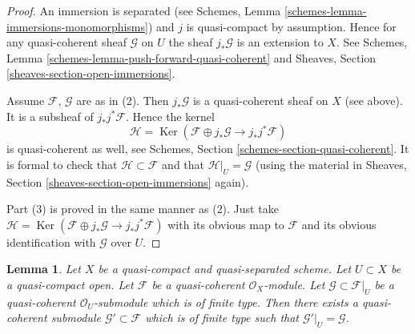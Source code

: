 \documentclass{stacks-project}
\theoremstyle{plain}
\newtheorem{lemma}[subsection]{Lemma}
\theoremstyle{definition}
\theoremstyle{remark}
\numberwithin{equation}{subsection}
\def\Ker{\mathop{\mathrm{Ker}}}
\begin{document}
\begin{proof}
An immersion is separated
(see Schemes, Lemma \ref{schemes-lemma-immersions-monomorphisms})
and $j$ is quasi-compact by assumption.
Hence for any quasi-coherent sheaf $\mathcal{G}$ on $U$ the sheaf
$j_*\mathcal{G}$ is an extension to $X$. See
Schemes, Lemma \ref{schemes-lemma-push-forward-quasi-coherent} and
Sheaves, Section \ref{sheaves-section-open-immersions}.

\medskip\noindent
Assume $\mathcal{F}$, $\mathcal{G}$ are as in (2).
Then $j_*\mathcal{G}$ is a quasi-coherent sheaf on $X$ (see above).
It is a subsheaf of $j_*j^*\mathcal{F}$.
Hence the kernel
$$
\mathcal{H} =
\Ker(\mathcal{F} \oplus j_* \mathcal{G}
\longrightarrow j_*j^*\mathcal{F})
$$
is quasi-coherent as well, see
Schemes, Section \ref{schemes-section-quasi-coherent}.
It is formal to check that $\mathcal{H} \subset \mathcal{F}$ and that
$\mathcal{H}|_U = \mathcal{G}$ (using the material in
Sheaves, Section \ref{sheaves-section-open-immersions} again).

\medskip\noindent
Part (3) is proved in the same manner as (2). Just take
$\mathcal{H} = \Ker(\mathcal{F} \oplus j_* \mathcal{G}
\to j_*j^*\mathcal{F})$ with its obvious map to $\mathcal{F}$
and its obvious identification with $\mathcal{G}$ over $U$.
\end{proof}

\begin{lemma}
\label{lemma-extend}
Let $X$ be a quasi-compact and quasi-separated scheme.
Let $U \subset X$ be a quasi-compact open.
Let $\mathcal{F}$ be a quasi-coherent $\mathcal{O}_X$-module.
Let $\mathcal{G} \subset \mathcal{F}|_U$ be a quasi-coherent
$\mathcal{O}_U$-submodule which is of finite type. Then
there exists a quasi-coherent submodule $\mathcal{G}' \subset \mathcal{F}$
which is of finite type such that $\mathcal{G}'|_U = \mathcal{G}$.
\end{lemma}
\end{document}
